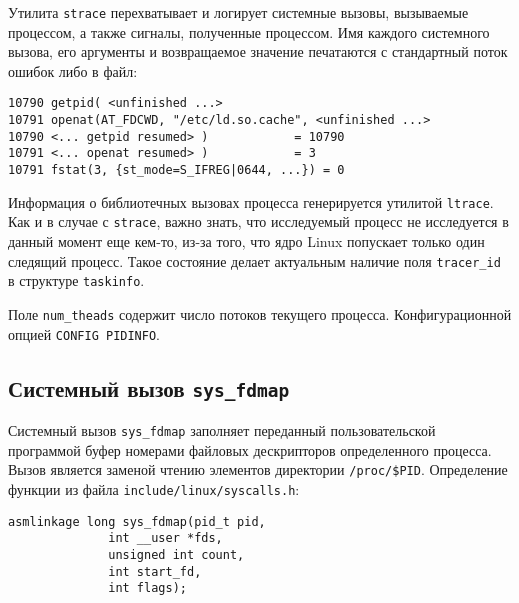 Утилита \texttt{strace} перехватывает и логирует системные вызовы, вызываемые
процессом, а также сигналы, полученные процессом. Имя каждого системного вызова,
его аргументы и возвращаемое значение печатаются с стандартный поток ошибок либо
в файл:

\medskip
\begin{lstlisting}[style=cstyle]
10790 getpid( <unfinished ...>
10791 openat(AT_FDCWD, "/etc/ld.so.cache", <unfinished ...>
10790 <... getpid resumed> )            = 10790
10791 <... openat resumed> )            = 3
10791 fstat(3, {st_mode=S_IFREG|0644, ...}) = 0
\end{lstlisting}
\medskip

Информация о библиотечных вызовах процесса генерируется утилитой
\texttt{ltrace}. Как и в случае с \texttt{strace}, важно знать, что исследуемый
процесс не исследуется в данный момент еще кем-то, из-за того, что ядро Linux
попускает только один следящий процесс. Такое состояние делает актуальным
наличие поля \texttt{tracer\_id} в структуре \texttt{taskinfo}.

Поле \texttt{num\_theads} содержит число потоков текущего процесса.
Конфигурационной опцией \texttt{CONFIG\ PIDINFO}.

\subsection{Системный вызов \texttt{sys\_fdmap}}

Системный вызов \texttt{sys\_fdmap} заполняет переданный пользовательской
программой буфер номерами файловых дескрипторов определенного процесса. Вызов
является заменой чтению элементов директории \texttt{/proc/\$PID}. Определение
функции из файла \texttt{include/linux/syscalls.h}:

\medskip
\begin{lstlisting}[style=cstyle]
asmlinkage long sys_fdmap(pid_t pid,
			  int __user *fds,
			  unsigned int count,
			  int start_fd,
			  int flags);
\end{lstlisting}
\medskip

